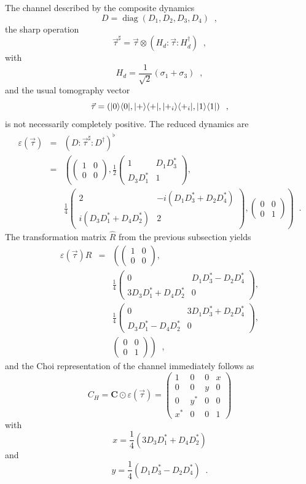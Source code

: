 The channel described by the composite dynamics
$$
D = \operatorname{diag}(D_1,D_2,D_3,D_4)\;\;,
$$
the sharp operation
$$
\vec{\tau}^\sharp = \vec{\tau}\otimes \left( H_d:\vec{\tau}:H_d^\dagger\right)\;\;,
$$
with
$$
H_d = \frac{1}{\sqrt{2}}\left(\sigma_1+\sigma_3\right)\;\;,
$$
and the usual tomography vector
$$
\vec{\tau} = \left(|0\rangle\langle0|,|+\rangle\langle+|,|+_i\rangle\langle+_i|,|1\rangle\langle1|\right)\;\;,
$$
is not necessarily completely positive.  The reduced dynamics are
\begin{eqnarray*}
\varepsilon\left(\vec{\tau}\right)&=&\left(D:\vec{\tau}^\sharp:D^\dagger\right)^\flat \\
&=& \left(\begin{pmatrix} 1&0\\ 0&0 \end{pmatrix} ,
\frac{1}{2}\begin{pmatrix} 1&D_1D_3^*\\ D_3D_1^*&1 \end{pmatrix},\right. \\
& &\left. \frac{1}{4}\begin{pmatrix} 2&-i(D_1D_3^*+D_2D_4^*)\\ i(D_3D_1^*+D_4D_2^*)&2 \end{pmatrix},
\begin{pmatrix} 0&0\\ 0&1 \end{pmatrix}\right)\;\;.
\end{eqnarray*}
The transformation matrix $\hat{R}$ from the previous subsection yields
\begin{eqnarray*}
\varepsilon\left(\vec{\tau}\right)\hat{R} &=&  \left(\begin{pmatrix} 1&0\\ 0&0 \end{pmatrix} ,\right.\\
& &\frac{1}{4}\begin{pmatrix} 0&D_1D_3^*-D_2D_4^*\\ 3D_3D_1^*+D_4D_2^*&0 \end{pmatrix},\\
& &\frac{1}{4}\begin{pmatrix} 0&3D_1D_3^*+D_2D_4^*\\ D_3D_1^*-D_4D_2^*&0 \end{pmatrix},\\
& & \left.\begin{pmatrix} 0&0\\ 0&1 \end{pmatrix}\right)\;\;,
\end{eqnarray*}
and the Choi representation of the channel immediately follows as 
$$
C_H =\mathbf{C}\odot\varepsilon(\vec{\tau}) = \begin{pmatrix}
1&0&0&x\\
0&0&y&0\\
0&y^*&0&0\\
x^*&0&0&1
\end{pmatrix}
$$
with
$$
x= \frac{1}{4} \left(3D_3D_1^*+D_4D_2^*\right)
$$
and
$$
y = \frac{1}{4} \left(D_1D_3^*-D_2D_4^*\right)\;\;.
$$

